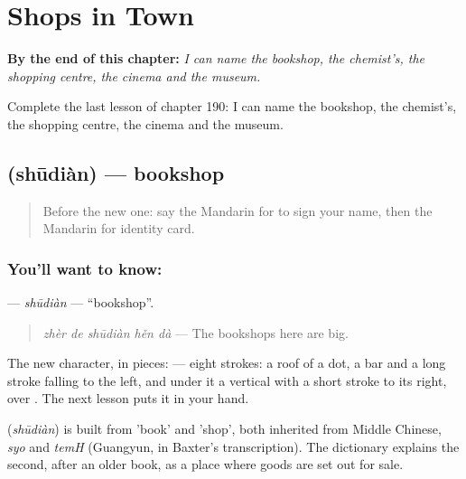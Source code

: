 
\chapter{Shops in Town}
\label{ch:zh-shops-in-town}

\begin{chapteropening}
\textbf{By the end of this chapter:} \emph{I can name the bookshop, the chemist's, the shopping centre, the cinema and the museum.}

Complete the last lesson of chapter 190: I can name the bookshop, the chemist's, the shopping centre, the cinema and the museum.
\end{chapteropening}

\section[\texorpdfstring{\zh{书店} (shūdiàn)}{书店 (shūdiàn)}]{ (shūdiàn) — bookshop}

\label{lesson:ZH-C190-shudian}



\begin{quote}
Before the new one: say the Mandarin for to sign your name, then the Mandarin for identity card.
\end{quote}

\subsection*{You'll want to know: }
\textbf{} — \emph{shūdiàn} — \textquotedblleft{}bookshop\textquotedblright{}.

\begin{quote}
\textbf{} \emph{zhèr de shūdiàn hěn dà} — The bookshops here are big.
\end{quote}

The new character, in pieces:  — eight strokes: a roof of a dot, a bar and a long stroke falling to the left, and under it a vertical with a short stroke to its right, over . The next lesson puts it in your hand.

\begin{cousinweb}
\textbf{} (\emph{shūdiàn}) is built from  'book' and  'shop', both inherited from Middle Chinese, \emph{syo} and \emph{temH} (Guangyun, in Baxter's transcription). The dictionary explains the second, after an older book, as a place where goods are set out for sale.
\end{cousinweb}

